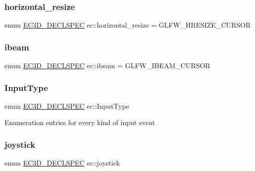 \mbox{\label{namespaceec_a6331d0d47cac81ec8a5104b9c2f647fe}} 
\subsubsection{\texorpdfstring{horizontal\+\_\+resize}{horizontal\_resize}}
{\footnotesize\ttfamily enum \mbox{\hyperlink{_common_8h_aac42573e202ca3dd4d259c81691e2369}{E\+C3\+D\+\_\+\+D\+E\+C\+L\+S\+P\+EC}} ec\+::horizontal\+\_\+resize = G\+L\+F\+W\+\_\+\+H\+R\+E\+S\+I\+Z\+E\+\_\+\+C\+U\+R\+S\+OR\hspace{0.3cm}{\ttfamily [strong]}}

\mbox{\label{namespaceec_a11b97e3d63932d34e6fb306f5389cad0}} 
\subsubsection{\texorpdfstring{ibeam}{ibeam}}
{\footnotesize\ttfamily enum \mbox{\hyperlink{_common_8h_aac42573e202ca3dd4d259c81691e2369}{E\+C3\+D\+\_\+\+D\+E\+C\+L\+S\+P\+EC}} ec\+::ibeam = G\+L\+F\+W\+\_\+\+I\+B\+E\+A\+M\+\_\+\+C\+U\+R\+S\+OR\hspace{0.3cm}{\ttfamily [strong]}}

\mbox{\label{namespaceec_ae2d697393ea83b34b18ab14eb5dacbca}} 
\subsubsection{\texorpdfstring{Input\+Type}{InputType}}
{\footnotesize\ttfamily enum \mbox{\hyperlink{_common_8h_aac42573e202ca3dd4d259c81691e2369}{E\+C3\+D\+\_\+\+D\+E\+C\+L\+S\+P\+EC}} ec\+::\+Input\+Type\hspace{0.3cm}{\ttfamily [strong]}}

Enumeration entries for every kind of input event \mbox{\label{namespaceec_a48a4c5a1e957c8419028491291e37634}} 
\subsubsection{\texorpdfstring{joystick}{joystick}}
{\footnotesize\ttfamily enum \mbox{\hyperlink{_common_8h_aac42573e202ca3dd4d259c81691e2369}{E\+C3\+D\+\_\+\+D\+E\+C\+L\+S\+P\+EC}} ec\+::joystick\hspace{0.3cm}{\ttfamily [strong]}}

